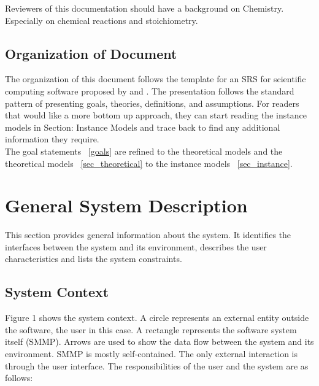 \documentclass[12pt]{article}
\begin{document}
Reviewers of this documentation should have a background on Chemistry. Especially on chemical reactions and stoichiometry.

\subsection{Organization of Document}

The organization of this document follows the template for an SRS for scientific computing software proposed by \cite{Parnas:1972} and \cite{Parnas:EAll:1984}. The presentation follows the standard pattern of presenting goals, theories, definitions, and assumptions. For readers that would like a more bottom up approach, they can start reading the instance models in Section: Instance Models and trace back to find any additional information they require. \\
The goal statements ~\ref{goals} are refined to the theoretical models and the theoretical models ~\ref{sec_theoretical} to the instance models  ~\ref{sec_instance}. 

\section{General System Description}

This section provides general information about the system.  It identifies the
interfaces between the system and its environment, describes the user
characteristics and lists the system constraints.  

\subsection{System Context}

Figure 1 shows the system context. A circle represents an external entity outside the
software, the user in this case. A rectangle represents the software system itself (SMMP).
Arrows are used to show the data flow between the system and its environment.
SMMP is mostly self-contained. The only external interaction is through the user interface. The responsibilities of the user and the system are as follows:
\end{document}
